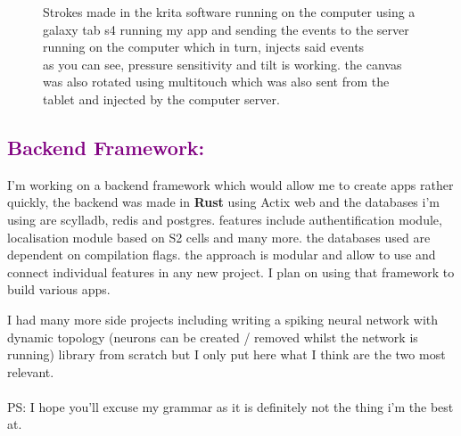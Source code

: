 \documentclass[a4paper,10pt]{article}
\begin{document}
\begin{spacing}{1}
	\begin{figure}[h!]
		\noindent{}
		\caption{Strokes made in the krita software running on the computer using a galaxy tab s4 running my app and sending the events to the server running on the computer which in turn, injects said events\\
		as you can see, pressure sensitivity and tilt is working.
		the canvas was also rotated using multitouch which was also sent from the tablet and injected by the computer server.
		}
	\end{figure}


\subsection*{\textcolor{purple}{Backend Framework:}}
	I'm working on a backend framework which would allow me to create apps rather quickly, the backend was made in \textbf{Rust} using Actix web and the databases i'm using are scylladb, redis and postgres.
features include authentification module, localisation module based on S2 cells and many more.
the databases used are dependent on compilation flags.
the approach is modular and allow to use and connect individual features in any new project.
I plan on using that framework to build various apps.

I had many more side projects including writing a spiking neural network with dynamic topology (neurons can be created / removed whilst the network is running) library from scratch
but I only put here what I think are the two most relevant.\\
\\
PS: I hope you'll excuse my grammar as it is definitely not the thing i'm the best at.

\end{spacing}
\end{document}
